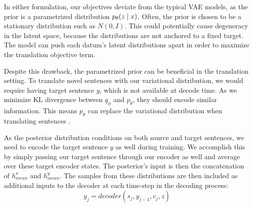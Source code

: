 

In either formulation, our objectives deviate from the typical VAE models, as the prior is a parametrized distribution $p_{\theta}(z \; | \;{x})$. Often, the prior is chosen to be a stationary distribution such as $N(0, I)$. This could potentially cause degeneracy in the latent space, because the distributions are not anchored to a fixed target. The model can push each datum's latent distributions apart in order to maximize the translation objective term. %

Despite this drawback, the parametrized prior can be beneficial in the translation setting. To translate novel sentences with our variational distribution, we would require having target sentence $y$, which is not available at decode time. As we minimize KL divergence between $q_{\phi}$ and $p_{\theta}$, they should encode similar information. This means $p_{\theta}$ can replace the variational distribution when translating sentences \cite{Zhang2016VNMT}. %

As the  posterior distribution conditions on both source and target sentences, we need to encode the target sentence $y$ as well during training. We accomplish this by simply passing our target sentence through our encoder as well and average over these target encoder states. The posterior's input is then the concatenation of $h_{mean}^{x}$ and $h_{mean}^{y}$. The samples from these distributions are then included as additional inputs to the decoder at each time-step in the decoding process:
\begin{equation}
y_{j} = decoder(s_{j}, y_{j-1}, c_{j}, z)
\end{equation}




